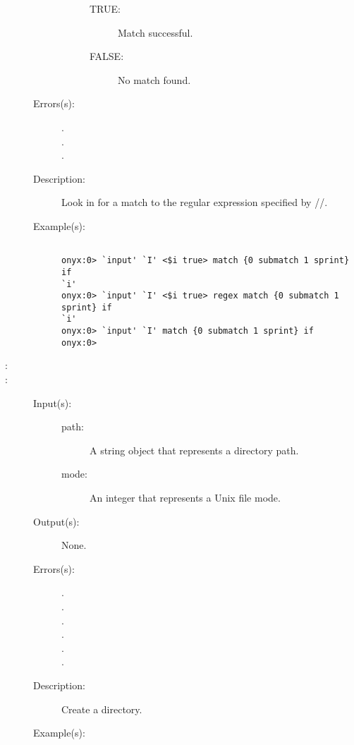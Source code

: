 \begin{description}
\begin{description}
\begin{description}
\begin{description}
			\item[TRUE: ] Match successful.
			\item[FALSE: ] No match found.
			\end{description}
		\end{description}
	\item[Errors(s): ]
		\begin{description}\item[]
		\item[.]
		\item[.]
		\item[.]
		\end{description}
	\item[Description: ]
		Look in  for a match to the regular expression
		specified by //.
	\item[Example(s): ]\begin{verbatim}

onyx:0> `input' `I' <$i true> match {0 submatch 1 sprint} if
`i'
onyx:0> `input' `I' <$i true> regex match {0 submatch 1 sprint} if
`i'
onyx:0> `input' `I' match {0 submatch 1 sprint} if
onyx:0>
		\end{verbatim}
	\end{description}
\label{systemdict:mkdir}
\item[{\onyxop{path}{mkdir}{--}}: ]
\item[{\onyxop{path mode}{mkdir}{--}}: ]
	\begin{description}\item[]
	\item[Input(s): ]
		\begin{description}\item[]
		\item[path: ]
			A string object that represents a directory path.
		\item[mode: ]
			An integer that represents a Unix file mode.
		\end{description}
	\item[Output(s): ] None.
	\item[Errors(s): ]
		\begin{description}\item[]
		\item[.]
		\item[.]
		\item[.]
		\item[.]
		\item[.]
		\item[.]
		\end{description}
	\item[Description: ]
		Create a directory.
	\item[Example(s): ]\begin{verbatim}


\end{verbatim}
\end{description}
\end{description}
